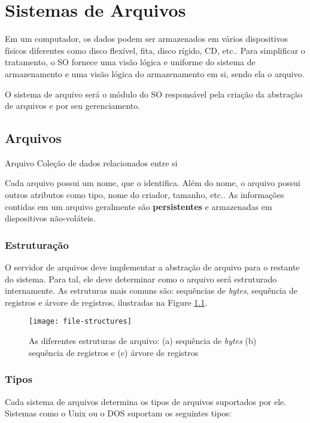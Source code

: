 \chapter{Sistemas de Arquivos}
Em um computador, os dados podem ser armazenados em vários dispositivos físicos diferentes como disco flexível, fita, disco rígido, CD, etc.. Para simplificar o tratamento, o SO fornece uma visão lógica e uniforme do sistema de armazenamento e uma visão lógica do armazenamento em si, sendo ela o arquivo.

O sistema de arquivo será o módulo do SO responsável pela criação da abstração de arquivos e por seu gerenciamento.

\section{Arquivos}
\begin{definicao}{Arquivo}
  Coleção de dados relacionados entre si
\end{definicao}

Cada arquivo possui um nome, que o identifica. Além do nome, o arquivo possui outros atributos como tipo, nome do criador, tamanho, etc.. As informações contidas em um arquivo geralmente são \textbf{persistentes} e armazenadas em dispositivos não-voláteis.

\subsection{Estruturação}
O servidor de arquivos deve implementar a abstração de arquivo para o restante do sistema. Para tal, ele deve determinar como o arquivo será estruturado internamente. As estruturas mais comuns são: sequências de \textit{bytes}, sequência de registros e árvore de registros, ilustradas na Figure \ref{fig:file-structures}.

\begin{figure}[h]
  \centering
  \texttt{[image: file-structures]}
  \caption{As diferentes estruturas de arquivo: (a) sequência de \textit{bytes} (b) sequência de registros e (c) árvore de registros}
  \label{fig:file-structures}
\end{figure}

\subsection{Tipos}
Cada sistema de arquivos determina os tipos de arquivos suportados por ele. Sistemas como o Unix ou o DOS suportam os seguintes tipos:

